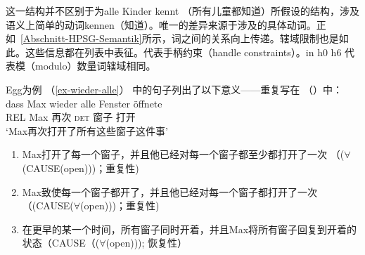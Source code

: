 这一结构并不区别于为alle Kinder kennt （所有儿童都知道）所假设的结构，涉及语义上简单的动词kennen（知道）。唯一的差异来源于涉及的具体动词。正如~\ref{Abschnitt-HPSG-Semantik}所示，词之间的关系向上传递。辖域限制也是如此。这些信息都在列表中表征。\hcons 代表手柄约束（handle constraints）。\qeq in h0 \qeq h6 代表模（modulo）数量词辖域相同。

Egg为例 （\ref{ex-wieder-alle}） 中的句子列出了以下意义——重复写在 （）中：
\ea
\label{ex-wieder-alle-zwei}
\gll dass Max wieder alle Fenster öffnete\\
	 REL Max 再次 \textsc{det} 窗子 打开\\
\glt `Max再次打开了所有这些窗子这件事'
\z
\begin{enumerate}
\item Max打开了每一个窗子，并且他已经对每一个窗子都至少都打开了一次 （($\forall$(CAUSE(open)))；重复性)
\item Max致使每一个窗子都开了，并且他已经对每一个窗子都打开了一次 （(CAUSE($\forall$(open)))；重复性)
\item 在更早的某一个时间，所有窗子同时开着，并且Max将所有窗子回复到开着的状态（CAUSE（($\forall$(open))); 恢复性）
\end{enumerate}

